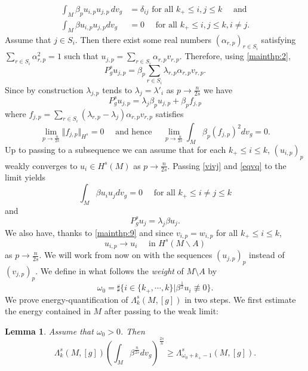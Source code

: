 \documentclass[10pt]{amsart}
\numberwithin{equation}{section}
\def\al{{\alpha}}
\def\La{{\Lambda}}
\def\be{{\beta}}
\def\om{{\omega}}
\def\la{{\lambda}}
\theoremstyle{plain}
\newtheorem{lemme}{Lemma}[section]%
\theoremstyle{remark}
\begin{document}
\begin{equation} \label{vivj}
\begin{aligned}
 \int_M \beta_p  u_{i,p} u_{j,p} \,dv_g & = \delta_{ij} \text{ for all } k_+ \le i,j \le k \quad \text{ and }\\
  \int_M \beta u_{i,p} u_{j,p} dv_g& = 0 \quad  \text{ for all } k_+ \le i,j \le k , i \neq j.  
\end{aligned}
\end{equation}
Assume that $j \in S_i$. Then there exist some real numbers $(\al_{r,p})_{r \in S_i}$ satisfying $\sum_{r \in S_i} \al_{r,p}^2 =1$ such that  $u_{j,p} = \sum_{r \in S_i}\al_{r,p} v_{r,p}$. 
Therefore, using \eqref{mainthp:2}, 
$$P_g^s u_{j,p} = \beta_p  \sum_{r \in S_i} \la_{r,p} \al_{r,p} v_{r,p}.$$  
Since by construction $\la_{j,p} $ tends to $\la_j=\la'_i$ as $p \to \frac{n}{2s}$ we have 
\begin{equation} \label{eqvq}
 P_g^s u_{j,p} = \la_j \be_p  u_{j,p} + \be_p f_{j,p}  
\end{equation}
where $f_{j,p}= \sum_{r \in S_i} (\la_{r,p}- \la_j) \al_{r,p} v_{r,p} $ satisfies
\begin{equation} \label{eqeq} 
\lim_{p \to \frac{n}{2s}} \Vert f_{j,p} \Vert_{H^s} = 0 \quad \text{ and hence } \quad  \lim_{p \to \frac{n}{2s}} \int_M \be_p (f_{j,p})^2 dv_g= 0. 
\end{equation}
Up to passing to a subsequence we can assume that for each $k_+ \le i \le k$, $(u_{i,p})_p$ weakly converges to $u_i \in H^s(M)$ as $p \to \frac{n}{2s}$. Passing \eqref{vivj} and \eqref{eqvq} to the limit yields
\begin{equation} \label{vivjlim}
  \int_M \beta u_{i} u_{j} dv_g = 0 \quad  \text{ for all } k_+ \le i \neq j \le k 
\end{equation}
and 
\begin{equation} \label{eqvlim}
 P_g^s u_j = \la_j \beta u_j.   
\end{equation}
We also have, thanks to \eqref{mainthp:9} and since $v_{i,p} = w_{i,p}$ for all $k_+ \le i \le k$,
\begin{equation} \label{convlim}
 u_{i,p} \to u_i \quad \text{ in } H^s(M \backslash A)
\end{equation}
as $p \to \frac{n}{2s}$. We will work from now on with the sequences $(u_{j,p})_p$ instead of $(v_{j,p})_p$. We define in what follows the {\em weight } of $M \setminus A$ by 
\begin{equation} \label{defom0}
\om_0= \sharp \{i \in  \{k_+,\cdots,k\} | \beta^{\frac{1}{2}} u_i \not\equiv 0\}.
\end{equation}
We prove energy-quantification of $\Lambda_k^s(M,[g])$ in two steps. We first estimate the energy contained in $M$ after passing to the weak limit: 
\begin{lemme} \label{mu(M)}
Assume that $\omega_0>0$. Then 
$$\La_k^s(M,[g]) \left( \int_M \beta^{\frac{n}{2s}} dv_g \right)^{\frac{2s}{n}} \geq \La_{\omega_0+k_+-1}^s (M,[g]).$$
\end{lemme}
\end{document}

